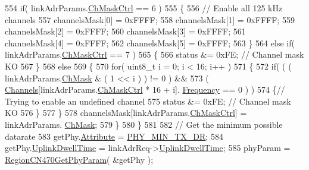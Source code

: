 \begin{DoxyCode}
554         \textcolor{keywordflow}{if}( linkAdrParams.\mbox{\hyperlink{structs_region_common_link_adr_params_ac5e1891f30a172b2ce39bc3498e1843d}{ChMaskCtrl}} == 6 )
555         \{
556             \textcolor{comment}{// Enable all 125 kHz channels}
557             channelsMask[0] = 0xFFFF;
558             channelsMask[1] = 0xFFFF;
559             channelsMask[2] = 0xFFFF;
560             channelsMask[3] = 0xFFFF;
561             channelsMask[4] = 0xFFFF;
562             channelsMask[5] = 0xFFFF;
563         \}
564         \textcolor{keywordflow}{else} \textcolor{keywordflow}{if}( linkAdrParams.\mbox{\hyperlink{structs_region_common_link_adr_params_ac5e1891f30a172b2ce39bc3498e1843d}{ChMaskCtrl}} == 7 )
565         \{
566             status &= 0xFE; \textcolor{comment}{// Channel mask KO}
567         \}
568         \textcolor{keywordflow}{else}
569         \{
570             \textcolor{keywordflow}{for}( uint8\_t i = 0; i < 16; i++ )
571             \{
572                 \textcolor{keywordflow}{if}( ( ( linkAdrParams.\mbox{\hyperlink{structs_region_common_link_adr_params_adb3d38c312a46e617b1319f97dd56a87}{ChMask}} & ( 1 << i ) ) != 0 ) &&
573                     ( \mbox{\hyperlink{_region_c_n470_8c_a23b07a348a0f1b8a5bc01990710126c1}{Channels}}[linkAdrParams.\mbox{\hyperlink{structs_region_common_link_adr_params_ac5e1891f30a172b2ce39bc3498e1843d}{ChMaskCtrl}} * 16 + i].
      \mbox{\hyperlink{structs_channel_params_ade3d190636488dad9a89b19446b7acf1}{Frequency}} == 0 ) )
574                 \{\textcolor{comment}{// Trying to enable an undefined channel}
575                     status &= 0xFE; \textcolor{comment}{// Channel mask KO}
576                 \}
577             \}
578             channelsMask[linkAdrParams.\mbox{\hyperlink{structs_region_common_link_adr_params_ac5e1891f30a172b2ce39bc3498e1843d}{ChMaskCtrl}}] = linkAdrParams.
      \mbox{\hyperlink{structs_region_common_link_adr_params_adb3d38c312a46e617b1319f97dd56a87}{ChMask}};
579         \}
580     \}
581 
582     \textcolor{comment}{// Get the minimum possible datarate}
583     getPhy.\mbox{\hyperlink{structs_get_phy_params_abdcb168ffd6913b85e2f635d7a475f2d}{Attribute}} = \mbox{\hyperlink{group___r_e_g_i_o_n_gga51cbe8f5433d914fe9cf81b451de2c2daace3e56c88b40def8ed6a9106871e7de}{PHY\_MIN\_TX\_DR}};
584     getPhy.\mbox{\hyperlink{structs_get_phy_params_a0e6663762d6f9173bc8d8cb018f8f17a}{UplinkDwellTime}} = linkAdrReq->\mbox{\hyperlink{structs_link_adr_req_params_a0e6663762d6f9173bc8d8cb018f8f17a}{UplinkDwellTime}};
585     phyParam = \mbox{\hyperlink{group___r_e_g_i_o_n_c_n470_gaa3f4e59184226b161b9e6880b6e7f204}{RegionCN470GetPhyParam}}( &getPhy );

\end{DoxyCode}
